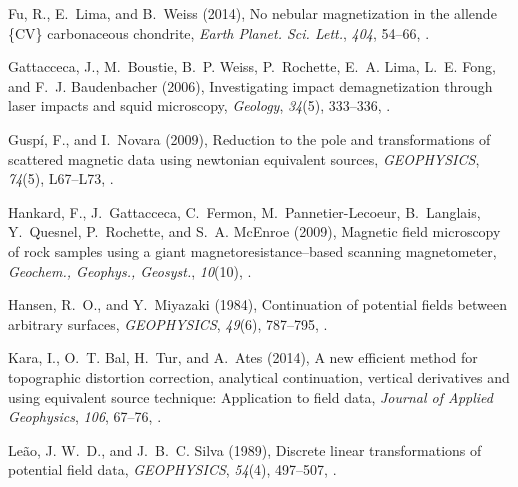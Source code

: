 \documentclass[galley,gc]{agutex}
\begin{document}
\begin{article}
\begin{thebibliography}{40}
Fu, R., E.~Lima, and B.~Weiss (2014), No nebular magnetization in the allende
  \{CV\} carbonaceous chondrite, \textit{Earth Planet. Sci. Lett.},
  \textit{404}, 54--66, .

Gattacceca, J., M.~Boustie, B.~P. Weiss, P.~Rochette, E.~A. Lima, L.~E. Fong,
  and F.~J. Baudenbacher (2006), Investigating impact demagnetization through
  laser impacts and squid microscopy, \textit{Geology}, \textit{34}(5),
  333--336, .

Gusp\'{i}, F., and I.~Novara (2009), Reduction to the pole and transformations
  of scattered magnetic data using newtonian equivalent sources,
  \textit{GEOPHYSICS}, \textit{74}(5), L67--L73, .

Hankard, F., J.~Gattacceca, C.~Fermon, M.~Pannetier-Lecoeur, B.~Langlais,
  Y.~Quesnel, P.~Rochette, and S.~A. McEnroe (2009), Magnetic field microscopy
  of rock samples using a giant magnetoresistance–based scanning
  magnetometer, \textit{Geochem., Geophys., Geosyst.}, \textit{10}(10),
  .

Hansen, R.~O., and Y.~Miyazaki (1984), Continuation of potential fields between
  arbitrary surfaces, \textit{GEOPHYSICS}, \textit{49}(6), 787--795,
  .

Kara, I., O.~T. Bal, H.~Tur, and A.~Ates (2014), A new efficient method for
  topographic distortion correction, analytical continuation, vertical
  derivatives and using equivalent source technique: Application to field data,
  \textit{Journal of Applied Geophysics}, \textit{106}, 67--76,
  .

Le\~{a}o, J. W.~D., and J.~B.~C. Silva (1989), Discrete linear transformations
  of potential field data, \textit{GEOPHYSICS}, \textit{54}(4), 497--507,
  .


\end{thebibliography}
\end{article}
\end{document}
